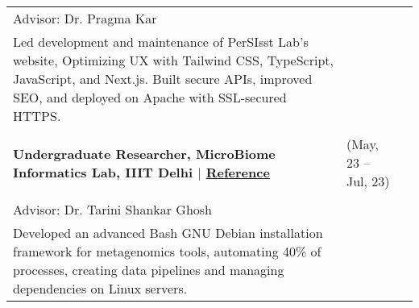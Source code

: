 \documentclass[10pt]{extarticle}
\begin{document}
\begin{contained}
\begin{longtable}{p{}p{}p{}}
    {Advisor: Dr. Pragma Kar}\\
    Led development and maintenance of PerSIsst Lab's website, Optimizing UX with Tailwind CSS, TypeScript, JavaScript, and Next.js. Built secure APIs, improved SEO, and deployed on Apache with SSL-secured HTTPS.\\
    \\
    \textbf{Undergraduate Researcher, MicroBiome Informatics Lab, IIIT Delhi $\vert$ \href{https://drive.google.com/drive/folders/1c-4UNfR6s3NiEw_pWJEUwc6RTah0MxOR?usp=sharing}{Reference}} &(May, 23 – Jul, 23)\\\\
    {Advisor: Dr. Tarini Shankar Ghosh}\\ Developed an advanced Bash GNU Debian installation framework for metagenomics tools, automating 40\% of processes, creating data pipelines and managing dependencies on Linux servers.
    \\
\end{longtable}%
\endgroup%
\end{contained}
\vspace{0pt}
\end{document}
